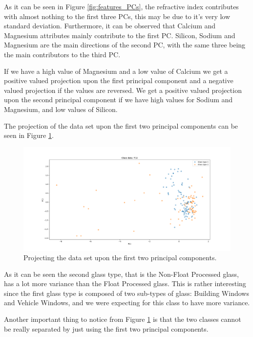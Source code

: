 \documentclass[12pt]{article}
\begin{document}
As it can be seen in Figure \ref{fig:features_PCs}, the refractive index contributes with almost nothing to the first three PCs, this may be due to it's very low standard deviation. Furthermore, it can be observed that Calcium and Magnesium attributes mainly contribute to the first PC. Silicon, Sodium and Magnesium are the main directions of the second PC, with the same three being the main contributors to the third PC. 

If we have a high value of Magnesium and a low value of Calcium we get a positive valued projection upon the first principal component and a negative valued projection if the values are reversed. We get a positive valued projection upon the second principal component if we have high values for Sodium and Magnesium, and low values of Silicon. 

The projection of the data set upon the first two principal components can be seen in Figure \ref{fig:projection_2PCs}.

    \begin{figure}[H]
        \centering
    	\includegraphics[width=\linewidth]{image/projection_2PCs.png}
    	\caption{Projecting the data set upon the first two principal components.}
    	\label{fig:projection_2PCs}
    \end{figure}
    
As it can be seen the second glass type, that is the Non-Float Processed glass, has a lot more variance than the Float Processed glass. This is rather interesting since the first glass type is composed of two sub-types of glass: Building Windows and Vehicle Windows, and we were expecting for this class to have more variance. 

Another important thing to notice from Figure \ref{fig:projection_2PCs} is that the two classes cannot be really separated by just using the first two principal components. 


\newpage

\begin{appendices}

\end{appendices}
\end{document}
